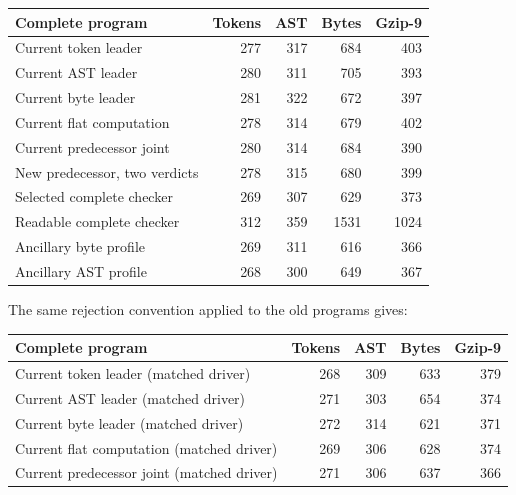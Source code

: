 \begin{center}\small
\begin{tabular}{lrrrr}
\toprule
Complete program & Tokens & AST & Bytes & Gzip-9\\
\midrule
Current token leader & 277 & 317 & 684 & 403\\
Current AST leader & 280 & 311 & 705 & 393\\
Current byte leader & 281 & 322 & 672 & 397\\
Current flat computation & 278 & 314 & 679 & 402\\
Current predecessor joint & 280 & 314 & 684 & 390\\
New predecessor, two verdicts & 278 & 315 & 680 & 399\\
Selected complete checker & 269 & 307 & 629 & 373\\
Readable complete checker & 312 & 359 & 1531 & 1024\\
Ancillary byte profile & 269 & 311 & 616 & 366\\
Ancillary AST profile & 268 & 300 & 649 & 367\\
\bottomrule
\end{tabular}
\end{center}

The same rejection convention applied to the old programs gives:

\begin{center}\small
\begin{tabular}{lrrrr}
\toprule
Complete program & Tokens & AST & Bytes & Gzip-9\\
\midrule
Current token leader (matched driver) & 268 & 309 & 633 & 379\\
Current AST leader (matched driver) & 271 & 303 & 654 & 374\\
Current byte leader (matched driver) & 272 & 314 & 621 & 371\\
Current flat computation (matched driver) & 269 & 306 & 628 & 374\\
Current predecessor joint (matched driver) & 271 & 306 & 637 & 366\\
\bottomrule
\end{tabular}
\end{center}
